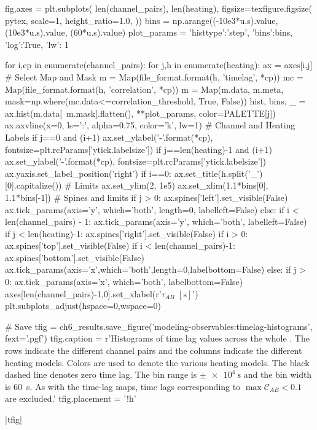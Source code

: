 \begin{pycode}
fig,axes = plt.subplots(
    len(channel_pairs), len(heating),
    figsize=texfigure.figsize(
        pytex,
        scale=1,
        height_ratio=1.0,
))
bins = np.arange((-10e3*u.s).value, (10e3*u.s).value, (60*u.s).value)
plot_params = { 'histtype':'step', 'bins':bins, 'log':True, 'lw': 1}

for i,cp in enumerate(channel_pairs):
    for j,h in enumerate(heating):
        ax = axes[i,j]
        # Select Map and Mask
        m = Map(file_format.format(h, 'timelag', *cp))
        mc = Map(file_format.format(h, 'correlation', *cp))
        m = Map(m.data, m.meta, mask=np.where(mc.data<=correlation_threshold, True, False))
        hist, bins, _ = ax.hist(m.data[~m.mask].flatten(), **plot_params, color=PALETTE[j])
        ax.axvline(x=0, ls=':', alpha=0.75, color='k', lw=1)
        # Channel and Heating Labels
        if j==0 and (i+1)%
            ax.set_ylabel('{}-{}'.format(*cp), fontsize=plt.rcParams['ytick.labelsize'])
        if j==len(heating)-1 and (i+1)%
            ax.set_ylabel('{}-{}'.format(*cp), fontsize=plt.rcParams['ytick.labelsize'])
            ax.yaxis.set_label_position('right')
        if i==0:
            ax.set_title(h.split('_')[0].capitalize())
        # Limits
        ax.set_ylim(2, 1e5)
        ax.set_xlim(1.1*bins[0], 1.1*bins[-1])
        # Spines and limits
        if j > 0:
            ax.spines['left'].set_visible(False)
            ax.tick_params(axis='y', which='both', length=0, labelleft=False)
        else:
            if i < len(channel_pairs) - 1:
                ax.tick_params(axis='y', which='both', labelleft=False)
        if j < len(heating)-1:
            ax.spines['right'].set_visible(False)
        if i > 0:
            ax.spines['top'].set_visible(False)
        if i < len(channel_pairs)-1:
            ax.spines['bottom'].set_visible(False)
            ax.tick_params(axis='x',which='both',length=0,labelbottom=False)
        else:
            if j > 0:
                ax.tick_params(axis='x', which='both', labelbottom=False)
axes[len(channel_pairs)-1,0].set_xlabel(r'$\tau_{AB}$ $[\si{\second}]$')
plt.subplots_adjust(hspace=0,wspace=0)

# Save
tfig = ch6_results.save_figure('modeling-observables:timelag-histograms', fext='.pgf')
tfig.caption = r'Histograms of time lag values across the whole \AR{}. The rows indicate the different channel pairs and the columns indicate the different heating models. Colors are used to denote the various heating models. The black dashed line denotes zero time lag. The bin range is $\pm\SI{e4}{\second}$ and the bin width is \SI{60}{\second}. As with the time-lag maps, time lags corresponding to $\max{\mathcal{C}_{AB}}<0.1$ are excluded.'
tfig.placement = '!h'
\end{pycode}
|tfig|

